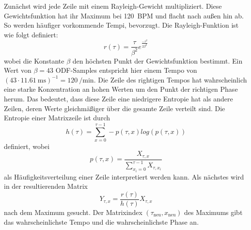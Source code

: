 {{{			%
			Zunächst wird jede Zeile mit einem Rayleigh-Gewicht multipliziert.
			Diese Gewichtsfunktion hat ihr Maximum bei \SI{120}{BPM} und flacht nach außen hin ab.
			So werden häufiger vorkommende Tempi, bevorzugt.
			Die Rayleigh-Funktion ist wie folgt definiert:
			\begin{equation}
				r(\tau) = \frac{\tau}{\beta^2}e^{\frac{-\tau^2}{2\beta^2}}
			\end{equation}
			wobei die Konstante $\beta$ den höchsten Punkt der Gewichtsfunktion bestimmt.
			Ein Wert von $\beta = 43$ ODF-Samples entspricht hier einem Tempo von
				$(43 \cdot \SI{11.61}{\milli\second})^{-1} = \SI{120}{\per\minute}$.
			Die Zeile des rightigen Tempos hat wahrscheinlich eine starke Konzentration an hohen Werten um den Punkt der richtigen Phase herum.
			Das bedeutet,
				dass diese Zeile eine niedrigere Entropie hat als andere Zeilen,
				deren Werte gleichmäßiger über die gesamte Zeile verteilt sind.
			Die Entropie einer Matrixzeile ist durch
				\begin{equation}
					h(\tau) = \sum_{x = 0}^{\tau - 1} -p(\tau, x) log(p(\tau, x))
				\end{equation}
				definiert, wobei
				\begin{equation}
					p(\tau, x) = \frac{X_{\tau, x}}{\sum_{x_i = 0}^{\tau - 1}X_{\tau, x_i}}
				\end{equation}
				als Häufigkeitsverteilung einer Zeile interpretiert werden kann.
			Als nächstes wird in der resultierenden Matrix
				\begin{equation}
					Y_{\tau, x} = \frac{r(\tau)}{h(\tau)}X_{\tau, x}
				\end{equation}
				nach dem Maximum gesucht.
			Der Matrixindex $(\tau_{\text{neu}}, x_{\text{neu}})$ des Maximums gibt das wahrscheinlichste Tempo und die wahrscheinlichste Phase an.

}}}
